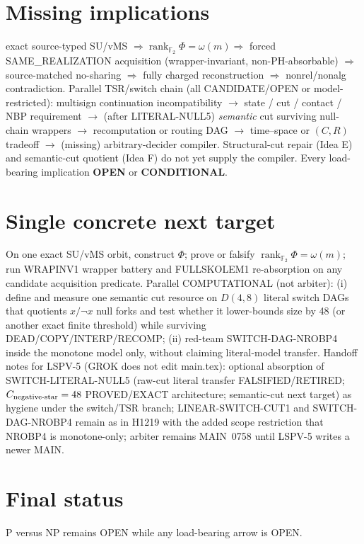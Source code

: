 \documentclass[11pt]{article}
\begin{document}
\section*{Missing implications}
exact source-typed SU/vMS $\Rightarrow\operatorname{rank}_{\mathbb F_2}\Phi=\omega(m)
\Rightarrow$ forced SAME\_REALIZATION acquisition (wrapper-invariant, non-PH-absorbable)
$\Rightarrow$ source-matched no-sharing $\Rightarrow$ fully charged reconstruction
$\Rightarrow$ nonrel/nonalg contradiction.
Parallel TSR/switch chain (all CANDIDATE/OPEN or model-restricted):
multisign continuation incompatibility $\to$ state / cut / contact / NBP requirement
$\to$ (after LITERAL-NULL5) \emph{semantic} cut surviving null-chain wrappers
$\to$ recomputation or routing DAG $\to$ time--space or $(C,R)$ tradeoff
$\to$ (missing) arbitrary-decider compiler.
Structural-cut repair (Idea E) and semantic-cut quotient (Idea F) do not yet supply the compiler.
Every load-bearing implication \textbf{OPEN} or \textbf{CONDITIONAL}.

\section*{Single concrete next target}
On one exact SU/vMS orbit, construct $\Phi$; prove or falsify
$\boxed{\operatorname{rank}_{\mathbb F_2}\Phi=\omega(m)}$;
run WRAPINV1 wrapper battery and FULLSKOLEM1 re-absorption on any candidate acquisition predicate.
Parallel COMPUTATIONAL (not arbiter): (i) define and measure one semantic cut resource on
$D(4,8)$ literal switch DAGs that quotients $x/\neg x$ null forks and test whether it
lower-bounds size by 48 (or another exact finite threshold) while surviving
DEAD/COPY/INTERP/RECOMP; (ii) red-team SWITCH-DAG-NROBP4 inside the monotone model only,
without claiming literal-model transfer.
Handoff notes for LSPV-5 (GROK does not edit main.tex): optional absorption of
SWITCH-LITERAL-NULL5 (raw-cut literal transfer FALSIFIED/RETIRED; $C_{\rm negative\textrm{-}star}=48$
PROVED/EXACT architecture; semantic-cut next target) as hygiene under the switch/TSR
branch; LINEAR-SWITCH-CUT1 and SWITCH-DAG-NROBP4 remain as in H1219 with the added
scope restriction that NROBP4 is monotone-only; arbiter remains MAIN~0758 until LSPV-5
writes a newer MAIN.

\section*{Final status}
P versus NP remains OPEN while any load-bearing arrow is OPEN.

\end{document}
